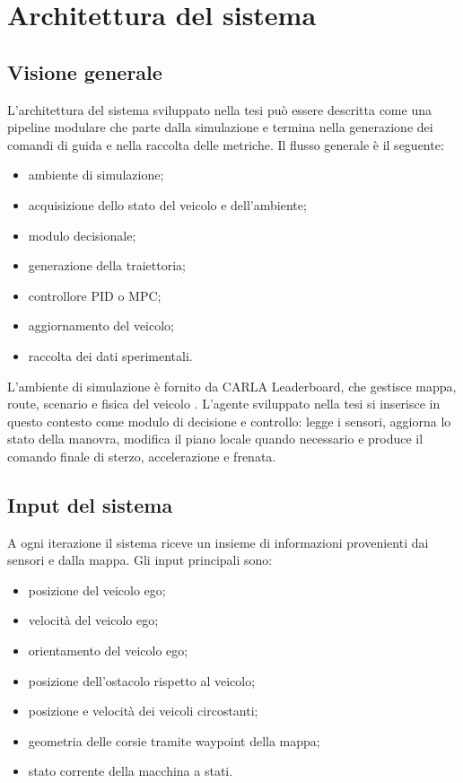 \chapter{Architettura del sistema}

\section{Visione generale}

L'architettura del sistema sviluppato nella tesi può essere descritta come una pipeline modulare che parte dalla simulazione e termina nella generazione dei comandi di guida e nella raccolta delle metriche. Il flusso generale è il seguente:

\begin{itemize}
    \item ambiente di simulazione;
    \item acquisizione dello stato del veicolo e dell'ambiente;
    \item modulo decisionale;
    \item generazione della traiettoria;
    \item controllore PID o MPC;
    \item aggiornamento del veicolo;
    \item raccolta dei dati sperimentali.
\end{itemize}

L'ambiente di simulazione è fornito da CARLA Leaderboard, che gestisce mappa, route, scenario e fisica del veicolo \cite{dosovitskiy2017carla}. L'agente sviluppato nella tesi si inserisce in questo contesto come modulo di decisione e controllo: legge i sensori, aggiorna lo stato della manovra, modifica il piano locale quando necessario e produce il comando finale di sterzo, accelerazione e frenata.

\section{Input del sistema}

A ogni iterazione il sistema riceve un insieme di informazioni provenienti dai sensori e dalla mappa. Gli input principali sono:

\begin{itemize}
    \item posizione del veicolo ego;
    \item velocità del veicolo ego;
    \item orientamento del veicolo ego;
    \item posizione dell'ostacolo rispetto al veicolo;
    \item posizione e velocità dei veicoli circostanti;
    \item geometria delle corsie tramite waypoint della mappa;
    \item stato corrente della macchina a stati.
\end{itemize}

